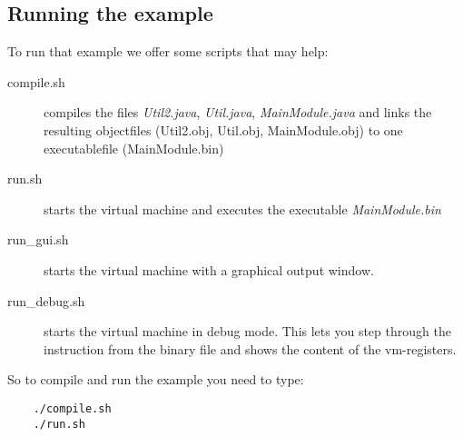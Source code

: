 \subsection{Running the example}
To run that example we offer some scripts that may help: 
\begin{description}
\item[compile.sh] compiles the files \emph{Util2.java}, \emph{Util.java},
\emph{MainModule.java} and links the resulting objectfiles (Util2.obj, Util.obj,
MainModule.obj) to one executablefile (MainModule.bin) 
\item[run.sh] starts the virtual machine and executes the executable \emph{MainModule.bin}
\item[run\_gui.sh] starts the virtual machine with a graphical output window. 
\item[run\_debug.sh] starts the virtual machine in debug mode. This lets you step
through the instruction from the binary file and shows the content of the vm-registers. 
\end{description}
So to compile and run the example you need to type: 
\begin{lstlisting}
	./compile.sh
	./run.sh
\end{lstlisting}